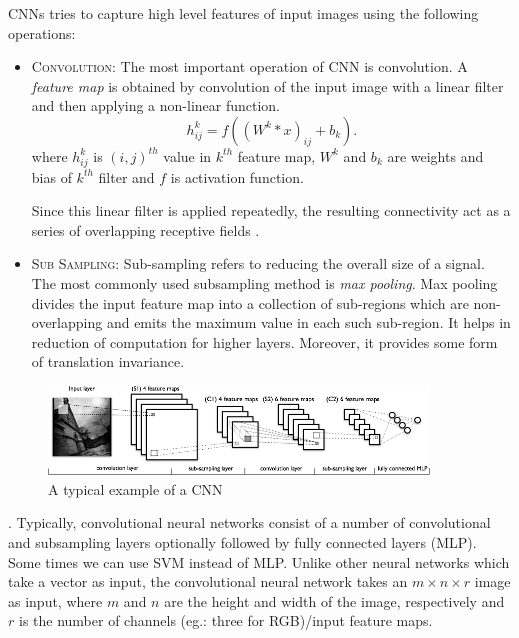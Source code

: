 \noindent CNNs tries to capture high level features of input images using the following operations:
\begin{itemize}
\item \textsc{Convolution}: The most important operation of CNN is convolution.  A \textit{feature map} is obtained by convolution of the input image with a linear filter and then applying a non-linear function. 
$$h^k_{ij} = \mathit{f}( (W^k * x)_{ij} + b_k ).$$
where $h^k_{ij}$ is $(i,j)^{th}$ value in $k^{th}$ feature map, $W^k$ and $b_k$ are weights and bias of $k^{th}$ filter and $\mathit{f}$ is activation function.

Since this linear filter is applied repeatedly, the resulting connectivity act as a series of overlapping receptive fields \cite{KarpathyCVPR14}.
\item \textsc{Sub Sampling}: Sub-sampling refers to reducing the overall size of a signal.  The most commonly used subsampling method is \textit{max pooling}.  Max pooling divides the input feature map into a collection of sub-regions which are non-overlapping and emits the maximum value in each such sub-region.  It helps in reduction of computation for higher layers.  Moreover, it provides some form of translation invariance. 
\end{itemize}

\begin{figure}[!ht]
\centering
\includegraphics[width=0.9\textwidth]{./imgs/cnn1.png} 
\caption[An example of a convolutional neural network]{A typical example of a CNN \footnotemark}
\label{fig:cnn}
\end{figure}
. 
Typically, convolutional neural networks consist of a number of convolutional and subsampling layers optionally followed by fully connected layers (MLP).  Some times we can use SVM instead of MLP.  Unlike other neural networks which take a vector as input,  the convolutional neural network takes an $m \times n \times r$ image as input, where $m$ and $n$ are the height and width of the image, respectively and $r$ is the number of channels (eg.: three for RGB)/input feature maps. 


